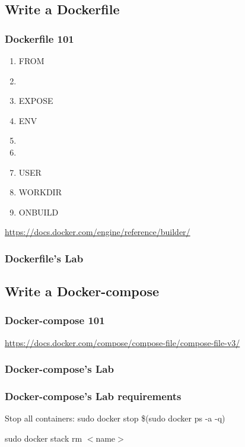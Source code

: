 \documentclass{beamer}
\begin{document}
\subsection{Write a Dockerfile}
\begin{frame}
    \frametitle{Dockerfile 101}
    \begin{multicols*}{2}
        \begin{enumerate}
            \item FROM
            \item {\color{mymauve}{RUN, CMD, ENTRYPOINT}}
            \item EXPOSE
            \item ENV
            \item {\color{mymauve}{ADD, COPY}}
            \item {\color{mymauve}{VOLUME}}
            \item USER
            \item WORKDIR
            \item ONBUILD
        \end{enumerate}
    \end{multicols*}
    \url{https://docs.docker.com/engine/reference/builder/}
\end{frame}

\begin{frame}
    \frametitle{Dockerfile's Lab}
    
\end{frame}

\subsection{Write a Docker-compose}
\begin{frame}
    \frametitle{Docker-compose 101}
    
    \small\url{https://docs.docker.com/compose/compose-file/compose-file-v3/}
\end{frame}

\begin{frame}
    \frametitle{Docker-compose's Lab}
    
\end{frame}

\begin{frame}
    \frametitle{Docker-compose's Lab requirements}
    

    \begin{block}{Stop all containers:}
        sudo docker stop \$(sudo docker ps -a -q)

        sudo docker stack rm $<$name$>$
    \end{block}
\end{frame}
\end{document}
